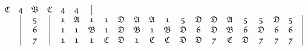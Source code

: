 \documentclass[final,12pt,a4paper,twoside,fleqn]{extbook}
\theoremstyle{definition}
\theoremstyle{remark}
\begin{document}
\begin{equation}
\begin{array}{@{}*{22}c@{}}
      {\mathfrak{C}}        &%
      {\mathfrak{4}} &%
      {\mathfrak{B}} &%
      {\mathfrak{C}} &%
      {\mathfrak{4}} &%
      {\mathfrak{4}} &%
      \big\vert         %
      \\ \nonumber
      {}             &%
      \big\vert        &%
      {\mathfrak{5}}       &%
      \big\vert        &%
      {\mathfrak{1}} &%
      {\mathfrak{A}} &%
      {\mathfrak{1}} &%
      {\mathfrak{1}} &%
      {\mathfrak{D}} &%
      {\mathfrak{A}}       &%
      {\mathfrak{A}}        &%
      {\mathfrak{1}} &%
      {\mathfrak{5}}       &%
      {\mathfrak{D}}     &%
      {\mathfrak{D}}        &%
      {\mathfrak{A}} &%
      {\mathfrak{5}} &%
      {\mathfrak{5}} &%
      {\mathfrak{D}} &%
      {\mathfrak{5}} &%
      \big\vert        %
      \\ \nonumber
      {}             &%
      \big\vert        &%
      {\mathfrak{6}}     &%
      \big\vert        &%
      {\mathfrak{1}} &%
      {\mathfrak{1}} &%
      {\mathfrak{B}} &%
      {\mathfrak{1}} &%
      {\mathfrak{D}} &%
      {\mathfrak{B}}       &%
      {\mathfrak{1}}        &%
      {\mathfrak{B}} &%
      {\mathfrak{D}}       &%
      {\mathfrak{6}}     &%
      {\mathfrak{D}}        &%
      {\mathfrak{B}} &%
      {\mathfrak{6}} &%
      {\mathfrak{D}} &%
      {\mathfrak{6}} &%
      {\mathfrak{6}} &%
      \big\vert         %
      \\ \nonumber
      {}             &%
      \big\vert        &%
      {\mathfrak{7}}        &%
      \big\vert        &%
      {\mathfrak{1}} &%
      {\mathfrak{1}} &%
      {\mathfrak{1}} &%
      {\mathfrak{C}} &%
      {\mathfrak{D}} &%
      {\mathfrak{1}}       &%
      {\mathfrak{C}}        &%
      {\mathfrak{C}} &%
      {\mathfrak{D}}       &%
      {\mathfrak{D}}     &%
      {\mathfrak{7}}        &%
      {\mathfrak{C}} &%
      {\mathfrak{D}} &%
      {\mathfrak{7}} &%
      {\mathfrak{7}} &%
      {\mathfrak{7}} &%
      \big\vert         %
      \\ \nonumber

\end{array}
\end{equation}
\end{document}
